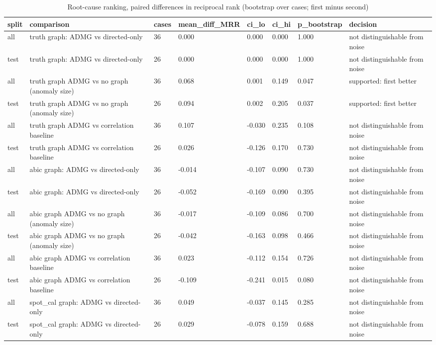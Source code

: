 \begin{table}[t]
\centering\footnotesize
\caption{Root-cause ranking, paired differences in reciprocal rank (bootstrap over cases; first minus second)}\label{tab:T6b_rca_paired}
\begin{tabular}{@{}llllllll@{}}
\toprule
split & comparison & cases & mean\_diff\_MRR & ci\_lo & ci\_hi & p\_bootstrap & decision\\
\midrule
all & truth graph: ADMG vs directed-only & 36 & 0.000 & 0.000 & 0.000 & 1.000 & not distinguishable from noise\\
test & truth graph: ADMG vs directed-only & 26 & 0.000 & 0.000 & 0.000 & 1.000 & not distinguishable from noise\\
all & truth graph ADMG vs no graph (anomaly size) & 36 & 0.068 & 0.001 & 0.149 & 0.047 & supported: first better\\
test & truth graph ADMG vs no graph (anomaly size) & 26 & 0.094 & 0.002 & 0.205 & 0.037 & supported: first better\\
all & truth graph ADMG vs correlation baseline & 36 & 0.107 & -0.030 & 0.235 & 0.108 & not distinguishable from noise\\
test & truth graph ADMG vs correlation baseline & 26 & 0.026 & -0.126 & 0.170 & 0.730 & not distinguishable from noise\\
all & abic graph: ADMG vs directed-only & 36 & -0.014 & -0.107 & 0.090 & 0.730 & not distinguishable from noise\\
test & abic graph: ADMG vs directed-only & 26 & -0.052 & -0.169 & 0.090 & 0.395 & not distinguishable from noise\\
all & abic graph ADMG vs no graph (anomaly size) & 36 & -0.017 & -0.109 & 0.086 & 0.700 & not distinguishable from noise\\
test & abic graph ADMG vs no graph (anomaly size) & 26 & -0.042 & -0.163 & 0.098 & 0.466 & not distinguishable from noise\\
all & abic graph ADMG vs correlation baseline & 36 & 0.023 & -0.112 & 0.154 & 0.726 & not distinguishable from noise\\
test & abic graph ADMG vs correlation baseline & 26 & -0.109 & -0.241 & 0.015 & 0.080 & not distinguishable from noise\\
all & spot\_cal graph: ADMG vs directed-only & 36 & 0.049 & -0.037 & 0.145 & 0.285 & not distinguishable from noise\\
test & spot\_cal graph: ADMG vs directed-only & 26 & 0.029 & -0.078 & 0.159 & 0.688 & not distinguishable from noise\\

\end{tabular}
\end{table}

